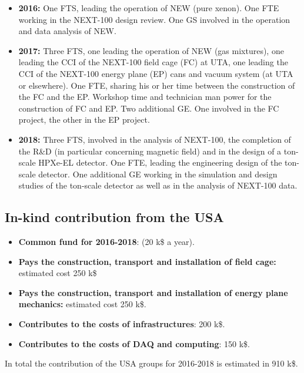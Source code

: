 \begin{itemize}
\item {\bf 2016:} One FTS, leading the operation of NEW (pure xenon). One FTE working in the NEXT-100 design review. One GS involved in the operation and data analysis of NEW. 
\item {\bf 2017:} Three FTS, one leading the operation of NEW (gas mixtures), one leading the CCI of the NEXT-100 field cage (FC) at UTA, one leading the CCI of the NEXT-100 energy plane (EP) cans and vacuum system (at UTA or elsewhere). One FTE, sharing his or her time between the construction of the FC and the EP. Workshop time and technician man power for the construction of FC and EP.  Two additional GE. One involved in the FC project, the other in the EP project. 
\item {\bf 2018:} Three FTS, involved in the analysis of NEXT-100, the completion of the R\&D (in particular concerning magnetic field) and in the design of a ton-scale HPXe-EL detector.  One FTE, leading the engineering design of the ton-scale detector. One additional GE working in the simulation and design studies of the ton-scale detector as well as in the analysis of NEXT-100 data.
\end{itemize}

\subsection{In-kind contribution from the USA}

\begin{itemize}
\item {\bf Common fund for 2016-2018}: (20 k\$ a year).  
\item {\bf Pays the construction, transport and installation of field cage:} estimated cost 
250 k\$
\item {\bf Pays the construction, transport and installation of energy plane mechanics:} estimated cost 250 k\$.
\item {\bf Contributes to the costs of infrastructures}: 200 k\$.
\item {\bf Contributes to the costs of DAQ and computing}: 150 k\$.
\end{itemize}

In total the contribution of the USA groups for 2016-2018 is estimated in 910 k\$. 
 
